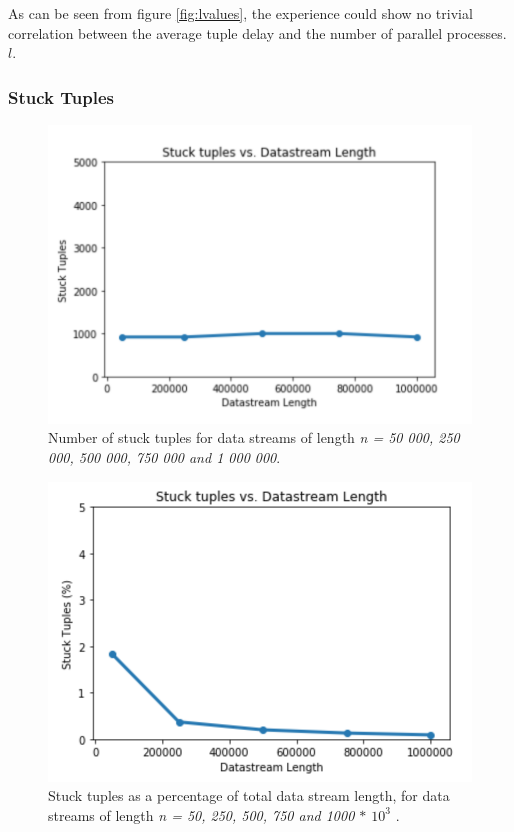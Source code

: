 \noindent As can be seen from figure \ref{fig:lvalues}, the experience could show no trivial correlation between the average tuple delay and the number of parallel processes.  $l$.

\subsubsection{Stuck Tuples}

\begin{figure}[H]
    \centering
    \includegraphics[scale=0.8]{Images/numbertuples.png}
    \caption{Number of stuck tuples for data streams of length \textit{n = 50 000, 250 000, 500 000, 750 000 and 1 000 000}. }
    \label{fig:stucknum}
\end{figure}

\begin{figure}[H]
    \centering
    \includegraphics[scale=0.8]{Images/percenttuples.png}
    \caption{Stuck tuples as a percentage of total data stream length, for data streams of length \textit{n = 50, 250, 500, 750 and 1000 $*$ $10^3$} .}
    \label{fig:stuckpercent}
\end{figure}

